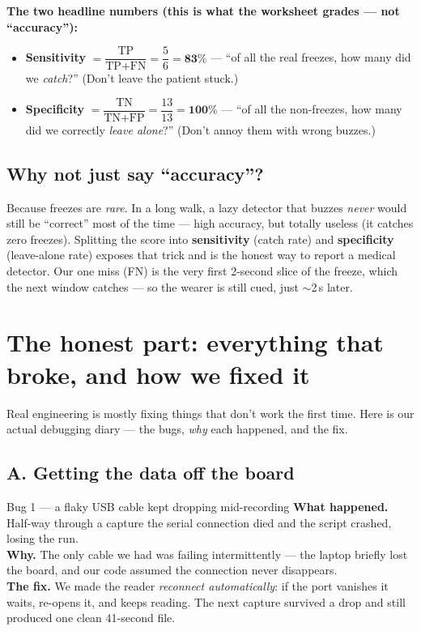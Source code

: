 \documentclass[11pt]{article}
\begin{document}
\begin{tcolorbox}[enhanced, colback=tealbg, colframe=teal, boxrule=1pt, arc=3pt,
   left=12pt, right=12pt, top=8pt, bottom=8pt]
\textbf{The two headline numbers (this is what the worksheet grades --- not
``accuracy''):}
\begin{itemize}
  \item \textbf{Sensitivity} $=\dfrac{\text{TP}}{\text{TP}+\text{FN}}
        =\dfrac{5}{6}=\mathbf{83\%}$ \;---\; ``of all the real freezes, how many
        did we \emph{catch}?'' (Don't leave the patient stuck.)
  \item \textbf{Specificity} $=\dfrac{\text{TN}}{\text{TN}+\text{FP}}
        =\dfrac{13}{13}=\mathbf{100\%}$ \;---\; ``of all the non-freezes, how many
        did we correctly \emph{leave alone}?'' (Don't annoy them with wrong buzzes.)
\end{itemize}
\end{tcolorbox}

\subsection*{Why not just say ``accuracy''?}
Because freezes are \emph{rare}. In a long walk, a lazy detector that buzzes
\emph{never} would still be ``correct'' most of the time --- high accuracy, but
totally useless (it catches zero freezes). Splitting the score into
\textbf{sensitivity} (catch rate) and \textbf{specificity} (leave-alone rate)
exposes that trick and is the honest way to report a medical detector. Our one
miss (FN) is the very first 2-second slice of the freeze, which the next window
catches --- so the wearer is still cued, just $\sim$2\,s later.

\section{The honest part: everything that broke, and how we fixed it}

Real engineering is mostly fixing things that don't work the first time. Here is
our actual debugging diary --- the bugs, \emph{why} each happened, and the fix.

\subsection*{A. Getting the data off the board}

\begin{fixcard}{Bug 1 --- a flaky USB cable kept dropping mid-recording}
\textbf{What happened.} Half-way through a capture the serial connection died and
the script crashed, losing the run. \\
\textbf{Why.} The only cable we had was failing intermittently --- the laptop
briefly lost the board, and our code assumed the connection never disappears. \\
\textbf{The fix.} We made the reader \emph{reconnect automatically}: if the port
vanishes it waits, re-opens it, and keeps reading. The next capture survived a
drop and still produced one clean 41-second file.
\end{fixcard}
\end{document}
